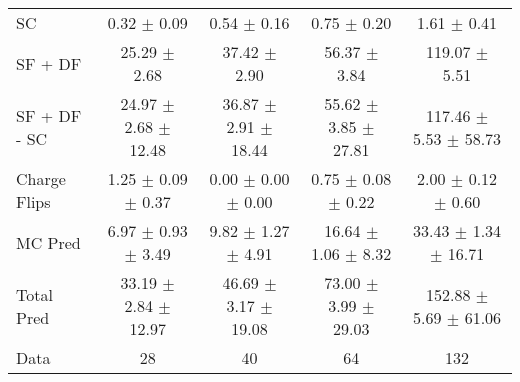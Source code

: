 \begin{tabular}{l|cccc}
                                 SC &  0.32 $\pm$  0.09 &  0.54 $\pm$  0.16 &  0.75 $\pm$  0.20 &  1.61 $\pm$  0.41 \\
                            SF + DF & 25.29 $\pm$  2.68 & 37.42 $\pm$  2.90 & 56.37 $\pm$  3.84 & 119.07 $\pm$  5.51 \\
\hline
                       SF + DF - SC & 24.97 $\pm$  2.68 $\pm$ 12.48 & 36.87 $\pm$  2.91 $\pm$ 18.44 & 55.62 $\pm$  3.85 $\pm$ 27.81 & 117.46 $\pm$  5.53 $\pm$ 58.73 \\
\hline\hline
                       Charge Flips &  1.25 $\pm$  0.09 $\pm$  0.37 &  0.00 $\pm$  0.00 $\pm$  0.00 &  0.75 $\pm$  0.08 $\pm$  0.22 &  2.00 $\pm$  0.12 $\pm$  0.60 \\
\hline
                            MC Pred &  6.97 $\pm$  0.93 $\pm$  3.49 &  9.82 $\pm$  1.27 $\pm$  4.91 & 16.64 $\pm$  1.06 $\pm$  8.32 & 33.43 $\pm$  1.34 $\pm$ 16.71 \\
\hline
                         Total Pred & 33.19 $\pm$  2.84 $\pm$ 12.97 & 46.69 $\pm$  3.17 $\pm$ 19.08 & 73.00 $\pm$  3.99 $\pm$ 29.03 & 152.88 $\pm$  5.69 $\pm$ 61.06 \\
\hline\hline
                               Data &    28 &    40 &    64 &   132 \\
\hline\hline
\end{tabular}


